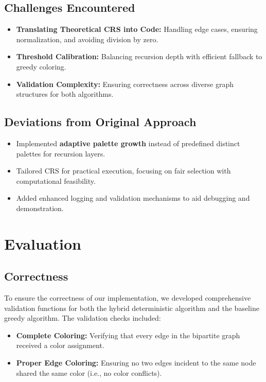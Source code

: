 \documentclass[11pt]{article}
\begin{document}
\subsection*{Challenges Encountered}
\begin{itemize}
    \item \textbf{Translating Theoretical CRS into Code:} Handling edge cases, ensuring normalization, and avoiding division by zero.
    \item \textbf{Threshold Calibration:} Balancing recursion depth with efficient fallback to greedy coloring.
    \item \textbf{Validation Complexity:} Ensuring correctness across diverse graph structures for both algorithms.
\end{itemize}

\subsection*{Deviations from Original Approach}
\begin{itemize}
    \item Implemented \textbf{adaptive palette growth} instead of predefined distinct palettes for recursion layers.
    \item Tailored CRS for practical execution, focusing on fair selection with computational feasibility.
    \item Added enhanced logging and validation mechanisms to aid debugging and demonstration.
\end{itemize}


\section{Evaluation}

\subsection{Correctness}
To ensure the correctness of our implementation, we developed comprehensive validation functions for both the hybrid deterministic algorithm and the baseline greedy algorithm. The validation checks included:

\begin{itemize}
    \item \textbf{Complete Coloring:} Verifying that every edge in the bipartite graph received a color assignment.
    \item \textbf{Proper Edge Coloring:} Ensuring no two edges incident to the same node shared the same color (i.e., no color conflicts).
\end{itemize}
\end{document}
